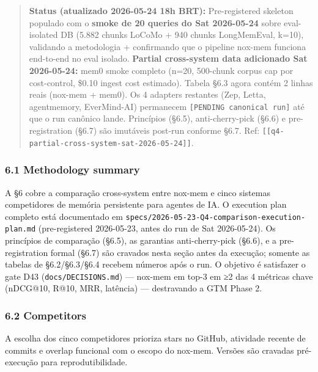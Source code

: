 \documentclass[
]{article}
\begin{document}
\begin{quote}
\textbf{Status (atualizado 2026-05-24 18h BRT):} Pre-registered skeleton
populado com o \textbf{smoke de 20 queries do Sat 2026-05-24} sobre
eval-isolated DB (5.882 chunks LoCoMo + 940 chunks LongMemEval, k=10),
validando a metodologia + confirmando que o pipeline nox-mem funciona
end-to-end no eval isolado. \textbf{Partial cross-system data adicionado
Sat 2026-05-24:} mem0 smoke completo (n=20, 500-chunk corpus cap por
cost-control, \$0.10 ingest cost estimado). Tabela §6.3 agora contém 2
linhas reais (nox-mem + mem0). Os 4 adapters restantes (Zep, Letta,
agentmemory, EverMind-AI) permanecem
\texttt{{[}PENDING\ canonical\ run{]}} até que o run canônico lande.
Princípios (§6.5), anti-cherry-pick (§6.6) e pre-registration (§6.7) são
imutáveis post-run conforme §6.7. Ref:
\texttt{{[}{[}q4-partial-cross-system-sat-2026-05-24{]}{]}}.
\end{quote}

\subsubsection{6.1 Methodology summary}\label{methodology-summary}

A §6 cobre a comparação cross-system entre nox-mem e cinco sistemas
competidores de memória persistente para agentes de IA. O execution plan
completo está documentado em
\texttt{specs/2026-05-23-Q4-comparison-execution-plan.md}
(pre-registered 2026-05-23, antes do run de Sat 2026-05-24). Os
princípios de comparação (§6.5), as garantias anti-cherry-pick (§6.6), e
a pre-registration formal (§6.7) são cravados nesta seção antes da
execução; somente as tabelas de §6.2/§6.3/§6.4 recebem números após o
run. O objetivo é satisfazer o gate D43 (\texttt{docs/DECISIONS.md}) ---
nox-mem em top-3 em ≥2 das 4 métricas chave (nDCG@10, R@10, MRR,
latência) --- destravando a GTM Phase 2.

\subsubsection{6.2 Competitors}\label{competitors}

A escolha dos cinco competidores prioriza stars no GitHub, atividade
recente de commits e overlap funcional com o escopo do nox-mem. Versões
são cravadas pré-execução para reprodutibilidade.
\end{document}
